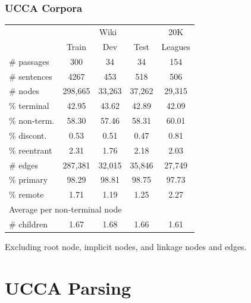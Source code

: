\documentclass[t]{beamer}
\begin{document}
\begin{frame}
\frametitle{UCCA Corpora}
\begin{center}
	\begin{tabular}{l|ccc|c}
	& \multicolumn{3}{c|}{Wiki} & 20K \\
	& \small Train & \small Dev & \small Test & Leagues \\
	\hline
	\# passages & 300 & 34 & 34 & 154 \\
	\# sentences & 4267 & 453 & 518 & 506 \\
	\hline
	\# nodes & 298,665 & 33,263 & 37,262 & 29,315 \\
	\% terminal & 42.95 & 43.62 & 42.89 & 42.09 \\
	\% non-term. & 58.30 & 57.46 & 58.31 & 60.01 \\
	\% discont. & 0.53 & 0.51 & 0.47 & 0.81 \\
	\% reentrant & 2.31 & 1.76 & 2.18 & 2.03 \\
	\hline
	\# edges & 287,381 & 32,015 & 35,846 & 27,749 \\
	\% primary & 98.29 & 98.81 & 98.75 & 97.73 \\
	\% remote & 1.71 & 1.19 & 1.25 & 2.27 \\
	\hline
	\multicolumn{3}{l}{\footnotesize Average per non-terminal node} \\
	\# children & 1.67 & 1.68 & 1.66 & 1.61 
	\end{tabular}
\end{center}

Excluding root node, implicit nodes, and linkage nodes and edges.
\end{frame}


\section[]{UCCA Parsing}
\end{document}
